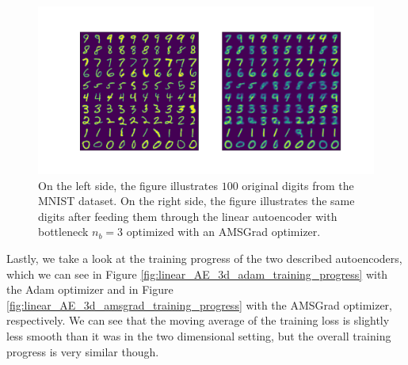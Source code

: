 \begin{figure}
\begin{center}
   \begin{minipage}[b]{\linewidth}
      \includegraphics[trim = 15mm 10mm 15mm 15mm, clip, width=\linewidth]{linear_AE_3d_amsgrad_inference}
	\end{minipage}
\end{center}
\caption{On the left side, the figure illustrates $100$ original digits from the MNIST dataset. On the right side, the figure illustrates the same digits after feeding them through the linear autoencoder with bottleneck $n_b=3$ optimized with an AMSGrad optimizer.}\label{fig:linear_AE_3d_amsgrad_inference}
\end{figure}

Lastly, we take a look at the training progress of the two described autoencoders, which we can see in Figure \ref{fig:linear_AE_3d_adam_training_progress} with the Adam optimizer and in Figure \ref{fig:linear_AE_3d_amsgrad_training_progress} with the AMSGrad optimizer, respectively. We can see that the moving average of the training loss is slightly less smooth than it was in the two dimensional setting, but the overall training progress is very similar though.

